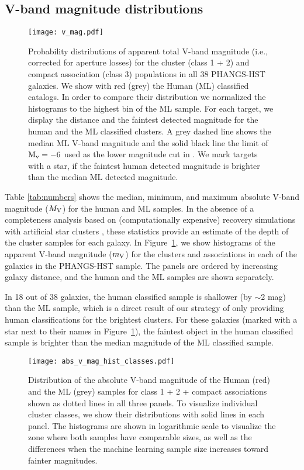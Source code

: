 \documentclass[linenumbers]{aastex63}
\begin{document}
\subsection{V-band magnitude distributions}\label{ssect:v_mag}
\begin{figure*} 
\texttt{[image: v\_mag.pdf]}
 \caption{Probability distributions of apparent total V-band magnitude (i.e., corrected for aperture losses) for {the cluster (class 1 + 2) and compact association (class 3) populations in all}  38 PHANGS-HST galaxies. We show with red (grey) the Human (ML) classified catalogs. 
{In order to compare their distribution we normalized the histograms to the highest bin of the ML sample.}
For each target, we display the distance and the faintest detected magnitude for the human and the ML classified clusters. A grey dashed line shows the median ML V-band magnitude and the solid black line the limit of ${\rm M_v=-6}$ used as the lower magnitude cut in \citet{adamo_legacy_2017}. We mark targets with a star, if the faintest human detected magnitude is brighter than the median ML detected magnitude.}
 \label{fig:v_mag_panel}
\end{figure*}
Table \ref{tab:numbers} shows the median, minimum, and maximum absolute V-band
magnitude ($M_{\rm V}$) for the human and ML samples.  In the absence of a completeness analysis based on (computationally expensive) recovery simulations with artificial star clusters \citep[e.g.][]{mayya08, adamo_legacy_2017, messa_young_2018, linden_massive_2021, linden_star_2022, tang_cluster_2023}, these statistics provide an estimate of the depth of the cluster samples for each galaxy. In Figure~\ref{fig:v_mag_panel}, we show histograms of the apparent V-band magnitude ($m_{\rm V}$) for the clusters and associations in each of the galaxies in the PHANGS-HST sample. The panels are ordered by increasing galaxy distance, and the human and the ML samples are shown separately.

In 18 out of 38 galaxies, the human classified sample is shallower (by $\sim$2 mag) than the ML sample, which is a direct result of our strategy of only providing human classifications for the brightest clusters. For these galaxies (marked with a star next to their names in Figure~\ref{fig:v_mag_panel}), the faintest object in the human classified sample is brighter than the median magnitude of the ML classified sample. 
\begin{figure} 
\texttt{[image: abs\_v\_mag\_hist\_classes.pdf]}
 \caption{Distribution of the absolute V-band magnitude of the Human (red) and the ML (grey) samples for class 1 + 2 + compact associations shown as dotted lines in all three panels. To visualize individual cluster classes, we show their distributions with solid lines in each panel. The histograms are shown in logarithmic scale to visualize the zone where both samples have comparable sizes, as well as the differences when the machine learning sample size increases toward fainter magnitudes. }\label{fig:v_abs_mag}
\end{figure}
\end{document}
